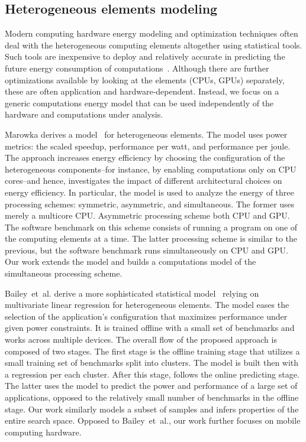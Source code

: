 \subsection{Heterogeneous elements modeling}
\label{sec:soa-ene-hete}

Modern computing hardware energy modeling and optimization techniques often deal with the heterogeneous computing elements altogether using statistical tools. Such tools are inexpensive to deploy and relatively accurate in predicting the future energy consumption of computations~\citep{bailey2014adaptive}. Although there are further optimizations available by looking at the elements (CPUs, GPUs) separately, these are often application and hardware-dependent. Instead, we focus on a generic computations energy model that can be used independently of the hardware and computations under analysis. 

Marowka derives a model~\citep{marowka2017energy} for heterogeneous elements. The model uses power metrics: the scaled speedup, performance per watt, and performance per joule. The approach increases energy efficiency by choosing the configuration of the heterogeneous components--for instance, by enabling computations only on CPU cores--and hence, investigates the impact of different architectural choices on energy efficiency. In particular, the model is used to analyze the energy of three processing schemes: symmetric, asymmetric, and simultaneous. The former uses merely a multicore CPU. Asymmetric processing scheme both CPU and GPU. The software benchmark on this scheme consists of running a program on one of the computing elements at a time. The latter processing scheme is similar to the previous, but the software benchmark runs simultaneously on CPU and GPU. Our work extends the model and builds a computations model of the simultaneous processing scheme.

Bailey~et~al. derive a more sophisticated statistical model~\citep{bailey2014adaptive} relying on multivariate linear regression for heterogeneous elements. The model eases the selection of the application's configuration that maximizes performance under given power constraints. It is trained offline with a small set of benchmarks and works across multiple devices. The overall flow of the proposed approach is composed of two stages. The first stage is the offline training stage that utilizes a small training set of benchmarks split into clusters. The model is built then with a regression per each cluster. After this stage, follows the online predicting stage. The latter uses the model to predict the power and performance of a large set of applications, opposed to the relatively small number of benchmarks in the offline stage. Our work similarly models a subset of samples and infers properties of the entire search space. Opposed to Bailey~et~al., our work further focuses on mobile computing hardware.

